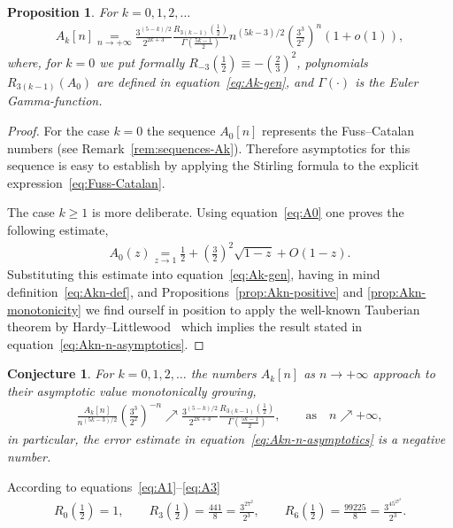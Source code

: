 \documentclass[pdftex]{sigma}
\numberwithin{equation}{section}
\newtheorem{Conjecture}[Theorem]{Conjecture}
\newtheorem{Proposition}[Theorem]{Proposition}
 { \theoremstyle{definition}
\newtheorem{Remark}[Theorem]{Remark} }
\begin{document}
\begin{Proposition}For $k=0,1,2,\ldots$
\begin{gather}\label{eq:Akn-n-asymptotics}
A_k[n]\underset{n\to+\infty}{=}
\frac{3^{(5-k)/2}}{2^{2k+3}}\frac{R_{3(k-1)}\left(\frac12\right)}{\Gamma\left(\frac{5k-1}{2}\right)}
n^{(5k-3)/2}\left(\frac{3^3}{2^2}\right)^n\left(1+o(1)\right),
\end{gather}
where, for $k=0$ we put formally $R_{-3}\left(\frac12\right)\equiv-\left(\frac23\right)^2$, polynomials $R_{3(k-1)}(A_0)$
are defined in equation~\eqref{eq:Ak-gen}, and $\Gamma(\cdot)$ is the Euler Gamma-function.
\end{Proposition}
\begin{proof}For the case $k=0$ the sequence $A_0[n]$ represents the Fuss--Catalan numbers (see Remark~\ref{rem:sequences-Ak}).
Therefore asymptotics for this sequence is easy to establish by applying the Stirling formula to
the explicit expression~\eqref{eq:Fuss-Catalan}.

The case $k\geq1$ is more deliberate. Using equation~\eqref{eq:A0} one proves the following estimate,
\begin{gather*}
A_0(z)\underset{z\to1}=\frac12 +\left(\frac32\right)^2\sqrt{1-z}+O\left(1-z\right).
\end{gather*}
Substituting this estimate into equation~\eqref{eq:Ak-gen}, having in mind definition~\eqref{eq:Akn-def}, and
Propositions~\ref{prop:Akn-positive} and \ref{prop:Akn-monotonicity} we find ourself in position to apply the
well-known Tauberian theorem by Hardy--Littlewood~\cite{HL} which implies the result stated in
equation~\eqref{eq:Akn-n-asymptotics}.
\end{proof}
\begin{Conjecture}
For $k=0,1,2,\dots$ the numbers $A_k[n]$ as $n\to+\infty$ approach to their asymptotic
value monotonically growing,
\begin{gather*}
\frac{A_k[n]}{n^{(5k-3)/2}}\left(\frac{3^3}{2^2}\right)^{-n}\nearrow
\frac{3^{(5-k)/2}}{2^{2k+3}}\frac{R_{3(k-1)}\left(\frac12\right)}{\Gamma\left(\frac{5k-1}{2}\right)},
\qquad\mathrm{as}\quad n\nearrow+\infty,
\end{gather*}
in particular, the error estimate in equation~\eqref{eq:Akn-n-asymptotics} is a negative number.
\end{Conjecture}
\begin{Remark}
According to equations~\eqref{eq:A1}--\eqref{eq:A3}
\begin{gather*}
R_0\left(\frac12\right)=1,\qquad
R_3\left(\frac12\right)=\frac{441}{8}=\frac{3^27^2}{2^3},\qquad
R_6\left(\frac12\right)=\frac{99225}{8}=\frac{3^45^27^2}{2^3}.
\end{gather*}
\end{Remark}
\end{document}
